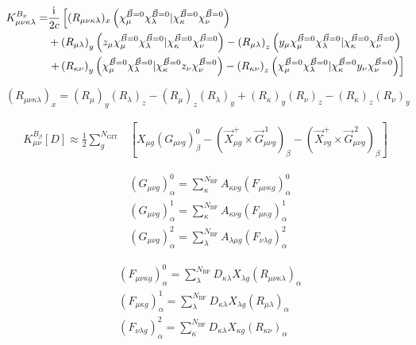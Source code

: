 	\begin{equation}
	\begin{aligned}
	K_{\mu\nu\kappa\lambda}^{B_x}=&\frac{\mathrm{i}\mkern1mu}{2c}\left[(R_{\mu\nu\kappa\lambda})_x\left(\chi_\mu^{\vec{B}=0}\chi_\lambda^{\vec{B}=0}\vert\chi_\kappa^{\vec{B}=0}\chi_\nu^{\vec{B}=0}\right)\right.\\
	&+\left(R_{\mu\lambda}\right)_y\left(z_\mu\chi_\mu^{\vec{B}=0}\chi_\lambda^{\vec{B}=0}\vert\chi_\kappa^{\vec{B}=0}\chi_\nu^{\vec{B}=0}\right)-\left(R_{\mu\lambda}\right)_z\left(y_\mu\chi_\mu^{\vec{B}=0}\chi_\lambda^{\vec{B}=0}\vert\chi_\kappa^{\vec{B}=0}\chi_\nu^{\vec{B}=0}\right)\\
	&\left.+\left(R_{\kappa\nu}\right)_y\left(\chi_\mu^{\vec{B}=0}\chi_\lambda^{\vec{B}=0}\vert\chi_\kappa^{\vec{B}=0}z_\nu\chi_\nu^{\vec{B}=0}\right)-\left(R_{\kappa\nu}\right)_z\left(\chi_\mu^{\vec{B}=0}\chi_\lambda^{\vec{B}=0}\vert\chi_\kappa^{\vec{B}=0}y_\nu\chi_\nu^{\vec{B}=0}\right)\right]
	\end{aligned}
	\end{equation}
	
	\begin{equation}
	(R_{\mu\nu\kappa\lambda})_x=(R_\mu)_y(R_\lambda)_z-(R_\mu)_z(R_\lambda)_y+(R_\kappa)_y(R_\nu)_z-(R_\kappa)_z(R_\nu)_y
	\end{equation}	
	
	\begin{equation}
	\begin{aligned}
	K_{\mu\nu}^{B_\beta}[D]\approx\frac{1}{2}\sum_{g}^{N_{\textrm{GIT}}}&\left[X_{\mu g}(G_{\mu\nu g})_\beta^0-\left(\vec{X}_{\mu g}^+\times\vec{G}_{\mu\nu g}^{\,1}\right)_\beta-\left(\vec{X}_{\nu g}^+\times\vec{G}_{\mu\nu g}^{\,2}\right)_\beta\right]
	\end{aligned}
	\end{equation}
	
	\begin{equation}
	\begin{aligned}
	&(G_{\mu\nu g})_\alpha^0=\sum_\kappa^{N_{\textrm{BF}}}A_{\kappa\nu g}(F_{\mu\nu\kappa g})_\alpha^0\\
	&(G_{\mu\nu g})_\alpha^1=\sum_\kappa^{N_{\textrm{BF}}}A_{\kappa\nu g}(F_{\mu\kappa g})_\alpha^1\\
	&(G_{\mu\nu g})_\alpha^2=\sum_\lambda^{N_{\textrm{BF}}}A_{\lambda\mu g}(F_{\nu\lambda g})_\alpha^2
	\end{aligned}
	\end{equation}	
	
	\begin{equation}
	\begin{aligned}
	&(F_{\mu\nu\kappa g})_\alpha^0=\sum_\lambda^{N_{\textrm{BF}}}D_{\kappa\lambda}X_{\lambda g}(R_{\mu\nu\kappa\lambda})_\alpha\\
	&(F_{\mu\kappa g})_\alpha^1=\sum_\lambda^{N_{\textrm{BF}}}D_{\kappa\lambda}X_{\lambda g}(R_{\mu\lambda})_\alpha\\
	&(F_{\nu\lambda g})_\alpha^2=\sum_\kappa^{N_{\textrm{BF}}}D_{\kappa\lambda}X_{\kappa g}(R_{\kappa\nu})_\alpha
	\end{aligned}
	\end{equation}
	
